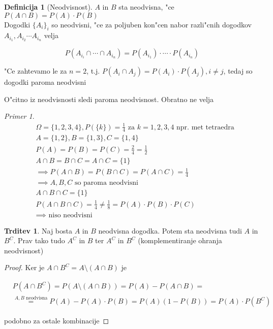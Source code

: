 \documentclass[a4paper,12pt]{article}
\theoremstyle{definition}
\newtheorem{defn}[counter]{Definicija}
\newtheorem{claim}[counter]{Trditev}
\theoremstyle{remark}
\newtheorem*{ex}{Primer}
\begin{document}

\begin{defn}[Neodvisnost]
    $A$ in $B$ sta neodvisna, "ce $P(A \cap B) = P(A) \cdot P(B)$ \\
    Dogodki $\{A_i\}_i$ so neodvisni, "ce za poljuben kon"cen nabor razli"cnih dogodkov $A_{i_1}, A_{i_2} \cdots
    A_{i_n}$ velja

    \begin{equation*}
        P(A_{i_i} \cap \cdots \cap A_{i_n}) = P(A_{i_1}) \cdot \cdots \cdot P(A_{i_n})
    \end{equation*}

    "Ce zahtevamo le za $n=2$, t.j. $P(A_i \cap A_j) = P(A_i) \cdot P(A_j), i \neq j$, tedaj so dogodki paroma
    neodvisni
\end{defn}

O"citno iz neodvisnosti sledi paroma neodvisnost. Obratno ne velja

\begin{ex}
    \begin{align*}
        &\Omega = \{1, 2, 3, 4\}, P(\{k\}) = \frac{1}{4} \text{ za } k = 1,2,3,4 \text{ npr. met tetraedra} \\
        &A = \{1, 2\}, B = \{1, 3\}, C = \{1, 4\} \\
        &P(A) = P(B) = P(C) = \frac{2}{4} = \frac{1}{2} \\
        &A \cap B = B \cap C = A \cap C = \{1\} \\
        &\implies P(A \cap B) = P(B \cap C) = P(A \cap C) = \frac{1}{4} \\
        &\implies A, B, C \text{ so paroma neodvisni} \\
        &A \cap B \cap C = \{1\} \\
        &P(A \cap B \cap C) = \frac{1}{4} \neq \frac{1}{8} = P(A) \cdot P(B) \cdot P(C) \\
        &\implies \text{ niso neodvisni}
    \end{align*}
\end{ex}

\begin{claim}
    Naj bosta $A$ in $B$ neodvisna dogodka. Potem sta neodvisna tudi $A$ in $B^C$. Prav tako tudo $A^C$ in $B$
    ter $A^C$ in $B^C$ (komplementiranje ohranja neodvisnost)
\end{claim}

\begin{proof}
    Ker je $A \cap B^C = A \text{\textbackslash} (A \cap B)$ je

    \begin{align*}
        &P(A \cap B^C) = P(A \text{\textbackslash} (A \cap B)) = P(A) - P(A \cap B) = \\
        &\stackrel{A, B \text{ neodvisna}}{=} P(A) - P(A) \cdot P(B) = P(A) (1-P(B)) = P(A) \cdot P(B^C)
    \end{align*}

    podobno za ostale kombinacije
\end{proof}
\end{document}
